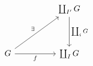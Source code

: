 \[\begin{tikzcd}
	&& {\coprod_{I'}G} \\
	\\
	G && {\coprod_{I}G}
	\arrow["f"', from=3-1, to=3-3]
	\arrow["{\coprod_{i}G}", from=1-3, to=3-3]
	\arrow["\exists", from=3-1, to=1-3]
\end{tikzcd}\]